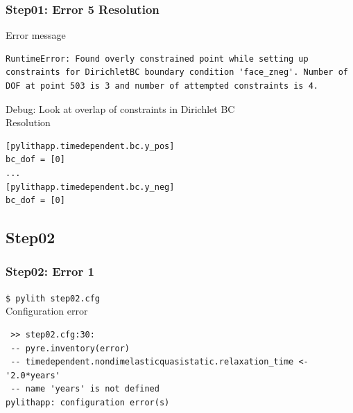 \documentclass[aspectration=169]{beamer}
\newcommand{\cmd}[1]{{\footnotesize\tt \color{ltred}#1}}
\newcommand{\errlabel}[1]{{\small \color{blue}#1}}
\newcommand{\debuginfo}[1]{{\small \color{green}#1}}
\begin{document}
\begin{frame}[fragile]
  \frametitle{Step01: Error 5 Resolution}

\errlabel{Error message}
\begin{lstlisting}
RuntimeError: Found overly constrained point while setting up constraints for DirichletBC boundary condition 'face_zneg'. Number of DOF at point 503 is 3 and number of attempted constraints is 4.
\end{lstlisting}\pause
\errlabel{Debug:} \debuginfo{Look at overlap of constraints in Dirichlet BC}\pause\\
\errlabel{Resolution}
\begin{lstlisting}
[pylithapp.timedependent.bc.y_pos]
bc_dof = [0]
...
[pylithapp.timedependent.bc.y_neg]
bc_dof = [0]
\end{lstlisting}

\end{frame}


\subsection{Step02}

\begin{frame}[fragile]
  \frametitle{Step02: Error 1}

\cmd{\$ pylith step02.cfg}\\
\errlabel{Configuration error}
\begin{lstlisting}
 >> step02.cfg:30:
 -- pyre.inventory(error)
 -- timedependent.nondimelasticquasistatic.relaxation_time <- '2.0*years'
 -- name 'years' is not defined
pylithapp: configuration error(s)
\end{lstlisting}
  
\end{frame}
\end{document}
